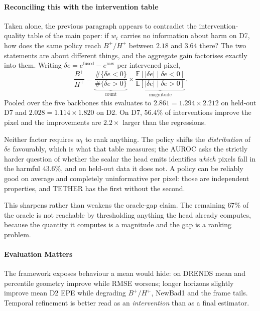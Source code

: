 \documentclass[letterpaper,10pt,conference]{ieeeconf}
\newcommand{\raw}{\mathrm{raw}}
\newcommand{\fused}{\mathrm{fused}}
\begin{document}
\paragraph{Reconciling this with the intervention table}

Taken alone, the previous paragraph appears to contradict the
intervention-quality table of the main paper: if $w_t$ carries no information
about harm on D7, how does the same policy reach $B^+/H^+$ between
$2.18$ and $3.64$ there? The two statements are about different things,
and the aggregate gain factorises exactly into them. Writing
$\delta e = e^{\fused}-e^{\raw}$ per intervened pixel,
%
\begin{equation}
\frac{B^+}{H^+}
=\underbrace{\frac{\#\{\delta e<0\}}{\#\{\delta e>0\}}}_{\text{count}}
\times
\underbrace{\frac{\mathbb{E}[|\delta e| \mid \delta e<0]}
                 {\mathbb{E}[|\delta e| \mid \delta e>0]}}_{\text{magnitude}} .
\label{eq:factorisation}
\end{equation}
%
Pooled over the five backbones this evaluates to $2.861=1.294\times2.212$
on held-out D7 and $2.028=1.114\times1.820$ on D2. On D7, $56.4\%$ of
interventions improve the pixel and the improvements are $2.2\times$ larger
than the regressions.

Neither factor requires $w_t$ to rank anything. The policy shifts the
\emph{distribution} of $\delta e$ favourably, which is what
that table measures; the AUROC asks the
strictly harder question of whether the scalar the head emits identifies
\emph{which} pixels fall in the harmful $43.6\%$, and on held-out data it
does not. A policy can be reliably good on average and completely
uninformative per pixel: those are independent properties, and TETHER has
the first without the second.

This sharpens rather than weakens the oracle-gap claim. The remaining
$67\%$ of the oracle is not reachable by thresholding anything the head
already computes, because the quantity it computes is a magnitude and the
gap is a ranking problem.


\paragraph{Evaluation Matters}

The framework exposes behaviour a mean would hide: on DRENDS mean and
percentile geometry improve while RMSE worsens; longer horizons slightly
improve mean D2 EPE while degrading $B^+/H^+$, NewBad1 and the frame
tails. Temporal refinement is better read as an \emph{intervention} than
as a final estimator.
\end{document}
